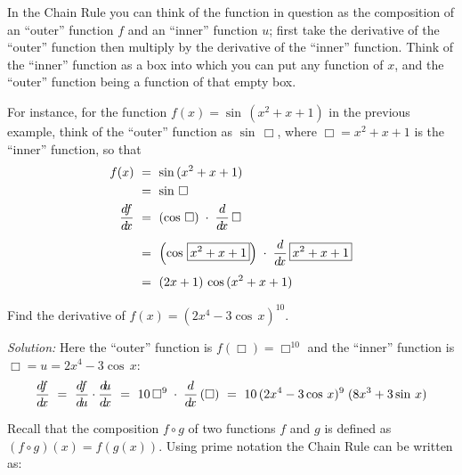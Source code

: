 In the Chain Rule you can think of the function in question as
the composition of an ``outer'' function $f$ and an ``inner'' function $u$;
first take the derivative of the ``outer'' function then multiply by the
derivative of the ``inner'' function. Think of the ``inner'' function as a box
into which you can put any function of $x$, and the ``outer'' function being
a function of that empty box.

For instance, for the function $f(x) = \sin\,(x^2 + x + 1)$ in the previous example,
think of the ``outer'' function as $\sin\,\Box$, where $\Box = x^2 + x + 1$ is the
``inner'' function, so that
\begin{align*}
 f(x) ~&=~ \sin\,(x^2 + x + 1)\\
 &=~ \sin\,\Box\\
 \dfdx ~&=~ \left(\cos\,\Box\right) \;\cdot\; \ddx\,\Box\\[4pt]
 &=~ \left(\cos\,\setlength{\fboxsep}{2pt}\boxed{x^2 + x + 1}\right) \;\cdot\;
     \ddx\,\setlength{\fboxsep}{2pt}\boxed{x^2 + x + 1}\\[4pt]
 &=~ (2x + 1)\,\cos\,(x^2 + x + 1)
\end{align*}

\begin{exmp}\label{exmp:chainrulepow}
 Find the derivative of $f(x) = (2x^4 - 3\cos\,x)^{10}$.\vspace{1mm}
 \par\noindent\emph{Solution:} Here the ``outer'' function is $f(\Box) = \Box^{10}$
 and the ``inner'' function is $\Box = u = 2x^4 - 3\cos\,x$:
 \begin{displaymath}
  \frac{d\negmedspace f}{d\!x} ~=~ \frac{d\negmedspace f}{d\!u} \cdot \frac{d\negmedspace u}{d\!x} ~=~ 10\,\Box^9 \;\cdot\; \frac{d}{d\!x}\,(\Box) ~=~
             10\,(2x^4 - 3\cos\,x)^9 \;(8x^3 + 3\sin\,x)
 \end{displaymath}
\end{exmp}
\divider
\newpage
Recall that the composition $f \circ g$ of two functions $f$ and $g$ is defined
as $(f \circ g)(x) = f(g(x))$. Using prime notation the Chain Rule can be
written as: 

